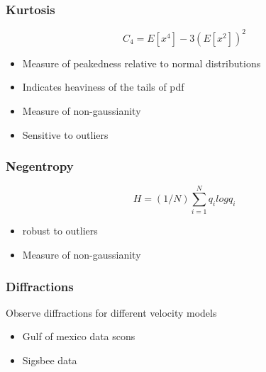 
\begin{frame} \frametitle{Kurtosis}

   \begin{equation} 
      C_4 = E[x^4] - 3(E[x^2])^2 
   \end{equation}
  \begin{itemize} 
    \item Measure of peakedness relative to normal distributions
    \item Indicates heaviness of the tails of pdf 
    \item Measure of non-gaussianity 
    \item Sensitive to outliers 
  \end{itemize}
\end{frame}
\begin{frame} \frametitle{Negentropy}

   \begin{equation} 
      H =(1/N) \sum_{i=1}^{N} q_i log q_i
   \end{equation}
  \begin{itemize} 
    \item robust to outliers
    \item Measure of non-gaussianity 
  \end{itemize}
\end{frame}
\begin{frame} 
   {}
\end{frame}
	

\begin{frame}
   {}
\end{frame}
\begin{frame} \frametitle{Diffractions}
Observe diffractions for different velocity models 
\begin{itemize}
   \item Gulf of mexico data scons 
   \item Sigsbee data 
\end{itemize}

\end{frame}
\cwpnote{}
